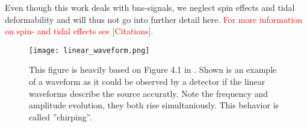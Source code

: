 Even though this work deals with \gls{bns}-signals, we neglect spin effects and tidal deformability and will thus not go into further detail here. \textcolor{red}{For more information on spin- and tidal effects see [Citations].}\\
\begin{figure}
\centering
\texttt{[image: linear\_waveform.png]}
\caption[Example time-evolution of a linear waveform]{This figure is heavily based on Figure 4.1 in \cite{gwv1}. Shown is an example of a waveform as it could be observed by a detector if the linear waveforms describe the source accuratly. Note the frequency and amplitude evolution, they both rise simultaniously. This behavior is called ''chirping''.}\label{fig:linear_waveform}
\end{figure}

